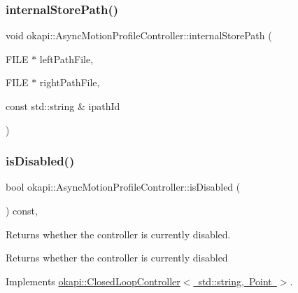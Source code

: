 \mbox{\label{classokapi_1_1AsyncMotionProfileController_ae9f67978e53a0bab9c96ef774505bd58}} 
\subsubsection{\texorpdfstring{internalStorePath()}{internalStorePath()}}
{\footnotesize\ttfamily void okapi\+::\+Async\+Motion\+Profile\+Controller\+::internal\+Store\+Path (\begin{DoxyParamCaption}\item[{F\+I\+LE $\ast$}]{left\+Path\+File,  }\item[{F\+I\+LE $\ast$}]{right\+Path\+File,  }\item[{const std\+::string \&}]{ipath\+Id }\end{DoxyParamCaption})\hspace{0.3cm}{\ttfamily [protected]}}

\mbox{\label{classokapi_1_1AsyncMotionProfileController_a04bc0f7be2c116163bfbef0571dec2ef}} 
\subsubsection{\texorpdfstring{isDisabled()}{isDisabled()}}
{\footnotesize\ttfamily bool okapi\+::\+Async\+Motion\+Profile\+Controller\+::is\+Disabled (\begin{DoxyParamCaption}{ }\end{DoxyParamCaption}) const\hspace{0.3cm}{\ttfamily [override]}, {\ttfamily [virtual]}}

Returns whether the controller is currently disabled.

\begin{DoxyReturn}{Returns}
whether the controller is currently disabled 
\end{DoxyReturn}


Implements \mbox{\hyperlink{classokapi_1_1ClosedLoopController_a40bd4ec2b8c75503fbf6f494fd7cbe69}{okapi\+::\+Closed\+Loop\+Controller$<$ std\+::string, Point $>$}}.

